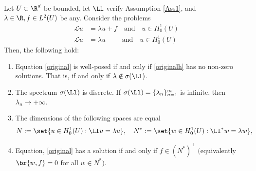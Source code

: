 \documentclass[
    a4paper,
    DIV=14,
    abstract=true,
    numbers=noenddot
]{scrartcl}
\begin{document}
\begin{theorem}\label{well-posedness Fredholm}
    Let $U\subset \R^d$ be bounded, let $\Ll$ verify Assumption \ref{Ass1}, and $\lambda \in \R, f \in L^2(U)$ be any. Consider the problems
    \begin{align}\label{original}
        \mathcal{L}u & = \lambda u + f \quad \text{and} \quad u \in H_0^1(U)                            \\
        \mathcal{L}u & = \lambda u \quad \hspace{17pt}\text{and} \quad u \in H_0^1(U) \label{originalh}
    \end{align}
    Then, the following hold:
    \begin{enumerate}
        \item Equation \eqref{original} is well-posed if and only if \eqref{originalh} has no non-zero solutions. That is, if and only if $\lambda \notin \sigma(\Ll)$.
        \item The spectrum $\sigma (\Ll )$ is discrete. If $\sigma(\Ll )= \{\lambda_n \}_{n=1}^\infty$ is infinite, then $\lambda _n \to +\infty$.
        \item The dimensions of the following spaces are equal
              \begin{align*}
                  N:= \set{u \in H_0^1(U): \Ll u = \lambda u}, \quad N^*:= \set{w \in H_0^1(U): \Ll^* w = \lambda w},
              \end{align*}
        \item Equation, \eqref{original} has a solution if and only if $f \in (N^*)^\perp$ $($equivalently $\br{w,f}=0$ for all $w \in N^* )$.
    \end{enumerate}
\end{theorem}
\end{document}
